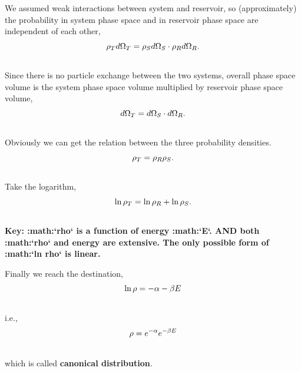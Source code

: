 \documentclass[letterpaper,10pt,english]{sphinxmanual}
\begin{document}
We assumed weak interactions between system and reservoir, so (approximately) the probability in system phase space and in reservoir phase space are independent of each other,
\begin{gather}
\begin{split}\rho _ T d\Omega_T = \rho _S d\Omega_S \cdot \rho _R d \Omega_R .\end{split}\notag\\\begin{split}\end{split}\notag
\end{gather}
Since there is no particle exchange between the two systems, overall phase space volume is the system phase space volume multiplied by reservoir phase space volume,
\begin{gather}
\begin{split}d\Omega_T = d\Omega _S \cdot d\Omega_R .\end{split}\notag\\\begin{split}\end{split}\notag
\end{gather}
Obviously we can get the relation between the three probability densities.
\begin{gather}
\begin{split}\rho_T = \rho_R \rho_S .\end{split}\notag\\\begin{split}\end{split}\notag
\end{gather}
Take the logarithm,
\begin{gather}
\begin{split}\ln\rho_T = \ln\rho_R + \ln\rho_S .\end{split}\notag\\\begin{split}\end{split}\notag
\end{gather}
\textbf{Key: :math:{}`rho{}` is a function of energy :math:{}`E{}`. AND both :math:{}`rho{}` and energy are extensive. The only possible form of :math:{}`ln rho{}` is linear.}

Finally we reach the destination,
\begin{gather}
\begin{split}\ln \rho = - \alpha - \beta E\end{split}\notag\\\begin{split}\end{split}\notag
\end{gather}
i.e.,
\begin{gather}
\begin{split}\rho = e^{-\alpha} e^{-\beta E}\end{split}\notag\\\begin{split}\end{split}\notag
\end{gather}
which is called \textbf{canonical distribution}.
\end{document}
